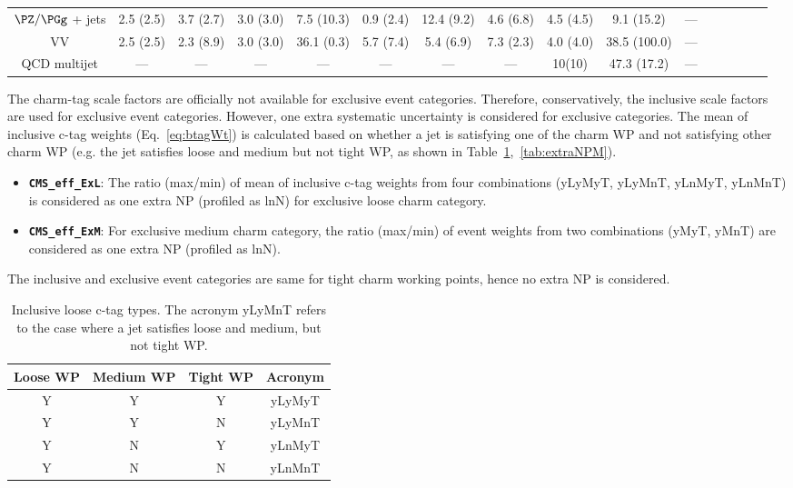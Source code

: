 \begin{table}
\begin{adjustbox}{max width=\textwidth}
\begin{tabular}{c  c c c c c c c c c c c c c cc}
$\PZ/\PGg$ + jets & 2.5 (2.5) &  3.7 (2.7) &  3.0 (3.0) & 7.5 (10.3) &  0.9 (2.4) &  12.4 (9.2) &  4.6 (6.8) &  4.5 (4.5) & 9.1 (15.2) & --- \\ 
VV & 2.5 (2.5) &  2.3 (8.9) &  3.0 (3.0) & 36.1 (0.3) &  5.7 (7.4) &  5.4 (6.9) &  7.3 (2.3) &  4.0 (4.0) & 38.5 (100.0) & --- \\ 
QCD multijet & --- &  --- &  --- & --- &  --- &  --- &  --- &  10(10) & 47.3 (17.2) & --- \\ 

\hline 
\end{tabular}
\end{adjustbox}
\end{table}

The charm-tag scale factors are officially not available for exclusive event 
categories. Therefore, conservatively, the inclusive scale factors are used for 
exclusive event categories. However, one extra systematic uncertainty is 
considered for exclusive categories. The mean of inclusive c-tag weights 
(Eq.~\ref{eq:btagWt}) is calculated based on whether a jet is satisfying one of
the charm WP and not satisfying other charm WP (e.g. the jet satisfies loose 
and medium but not tight WP, as shown in Table~\ref{tab:extraNPL},~\ref{tab:extraNPM}). 
\begin{itemize}
\item {\bf{\verb|CMS_eff_ExL|}}: The ratio (max/min) of mean of inclusive c-tag weights from four
    combinations (yLyMyT, yLyMnT, yLnMyT, yLnMnT) is considered as one extra NP (profiled as
    lnN) for exclusive loose charm category.
\item {\bf{\verb|CMS_eff_ExM|}}: For exclusive medium charm category, the ratio (max/min) of
    event weights from two combinations (yMyT, yMnT) are considered as one extra NP
    (profiled as lnN).
\end{itemize}
The inclusive and exclusive event categories are same for tight charm working points, hence no
extra NP is considered.
\begin{table}
\begin{center}
\begin{tabular}{cccc}
\hline
\hline
{\bf{Loose WP}} & {\bf{Medium WP}} & {\bf{Tight WP}} & {\bf{Acronym}} \\
\hline
\hline
Y     & Y & Y & yLyMyT \\
Y     & Y & N & yLyMnT \\
Y     & N & Y & yLnMyT \\
Y     & N & N & yLnMnT  \\
\hline
\end{tabular}
\caption{Inclusive loose c-tag types. The acronym yLyMnT refers to the case where a jet
\label{tab:extraNPL}
satisfies loose and medium, but not tight WP.}
\end{center}
\end{table}
